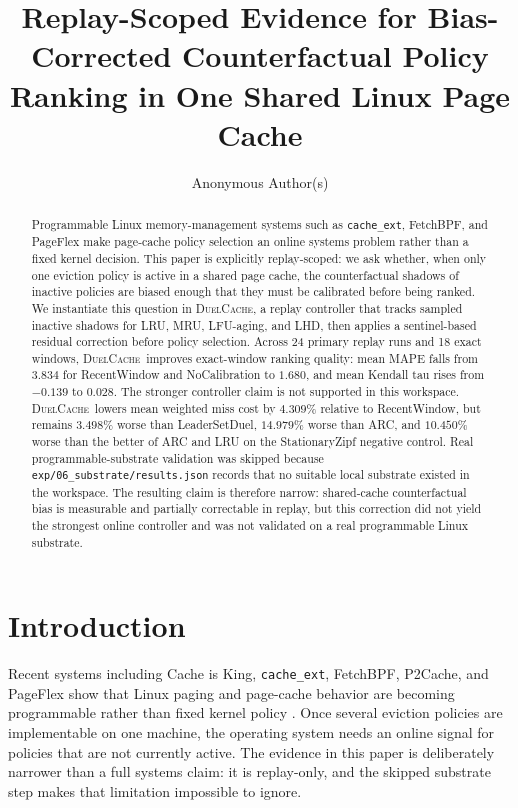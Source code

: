 \documentclass{article}
\title{Replay-Scoped Evidence for Bias-Corrected Counterfactual Policy Ranking in One Shared Linux Page Cache}
\author{Anonymous Author(s)}
\newcommand{\duel}{\textsc{DuelCache}}
\begin{document}
\maketitle

\begin{abstract}
Programmable Linux memory-management systems such as \texttt{cache\_ext}, FetchBPF, and PageFlex make page-cache policy selection an online systems problem rather than a fixed kernel decision. This paper is explicitly replay-scoped: we ask whether, when only one eviction policy is active in a shared page cache, the counterfactual shadows of inactive policies are biased enough that they must be calibrated before being ranked. We instantiate this question in \duel, a replay controller that tracks sampled inactive shadows for \mbox{LRU}, \mbox{MRU}, \mbox{LFU-aging}, and LHD, then applies a sentinel-based residual correction before policy selection. Across 24 primary replay runs and 18 exact windows, \duel\ improves exact-window ranking quality: mean MAPE falls from $3.834$ for RecentWindow and NoCalibration to $1.680$, and mean Kendall tau rises from $-0.139$ to $0.028$. The stronger controller claim is not supported in this workspace. \duel\ lowers mean weighted miss cost by $4.309\%$ relative to RecentWindow, but remains $3.498\%$ worse than LeaderSetDuel, $14.979\%$ worse than ARC, and $10.450\%$ worse than the better of ARC and LRU on the StationaryZipf negative control. Real programmable-substrate validation was skipped because \texttt{exp/06\_substrate/results.json} records that no suitable local substrate existed in the workspace. The resulting claim is therefore narrow: shared-cache counterfactual bias is measurable and partially correctable in replay, but this correction did not yield the strongest online controller and was not validated on a real programmable Linux substrate.
\end{abstract}

\section{Introduction}
\label{sec:intro}

Recent systems including Cache is King, \texttt{cache\_ext}, FetchBPF, P2Cache, and PageFlex show that Linux paging and page-cache behavior are becoming programmable rather than fixed kernel policy \citep{zussman2025cache,zussman2025cacheext,cao2024fetchbpf,lee2023p2cache,yelam2025pageflex}. Once several eviction policies are implementable on one machine, the operating system needs an online signal for policies that are not currently active. The evidence in this paper is deliberately narrower than a full systems claim: it is replay-only, and the skipped substrate step makes that limitation impossible to ignore.
\end{document}
